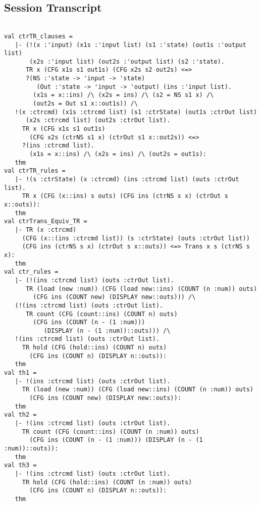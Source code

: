 \documentclass{report}
\begin{document}
\subsection{Session Transcript}
\label{trans6}
\begin{session}
  \begin{scriptsize}
\begin{verbatim}

val ctrTR_clauses =
   |- (!(x :'input) (x1s :'input list) (s1 :'state) (out1s :'output list)
       (x2s :'input list) (out2s :'output list) (s2 :'state).
      TR x (CFG x1s s1 out1s) (CFG x2s s2 out2s) <=>
      ?(NS :'state -> 'input -> 'state)
         (Out :'state -> 'input -> 'output) (ins :'input list).
        (x1s = x::ins) /\ (x2s = ins) /\ (s2 = NS s1 x) /\
        (out2s = Out s1 x::out1s)) /\
   !(x :ctrcmd) (x1s :ctrcmd list) (s1 :ctrState) (out1s :ctrOut list)
      (x2s :ctrcmd list) (out2s :ctrOut list).
     TR x (CFG x1s s1 out1s)
       (CFG x2s (ctrNS s1 x) (ctrOut s1 x::out2s)) <=>
     ?(ins :ctrcmd list).
       (x1s = x::ins) /\ (x2s = ins) /\ (out2s = out1s):
   thm
val ctrTR_rules =
   |- !(s :ctrState) (x :ctrcmd) (ins :ctrcmd list) (outs :ctrOut list).
     TR x (CFG (x::ins) s outs) (CFG ins (ctrNS s x) (ctrOut s x::outs)):
   thm
val ctrTrans_Equiv_TR =
   |- TR (x :ctrcmd)
     (CFG (x::(ins :ctrcmd list)) (s :ctrState) (outs :ctrOut list))
     (CFG ins (ctrNS s x) (ctrOut s x::outs)) <=> Trans x s (ctrNS s x):
   thm
val ctr_rules =
   |- (!(ins :ctrcmd list) (outs :ctrOut list).
      TR (load (new :num)) (CFG (load new::ins) (COUNT (n :num)) outs)
        (CFG ins (COUNT new) (DISPLAY new::outs))) /\
   (!(ins :ctrcmd list) (outs :ctrOut list).
      TR count (CFG (count::ins) (COUNT n) outs)
        (CFG ins (COUNT (n - (1 :num)))
           (DISPLAY (n - (1 :num))::outs))) /\
   !(ins :ctrcmd list) (outs :ctrOut list).
     TR hold (CFG (hold::ins) (COUNT n) outs)
       (CFG ins (COUNT n) (DISPLAY n::outs)):
   thm
val th1 =
   |- !(ins :ctrcmd list) (outs :ctrOut list).
     TR (load (new :num)) (CFG (load new::ins) (COUNT (n :num)) outs)
       (CFG ins (COUNT new) (DISPLAY new::outs)):
   thm
val th2 =
   |- !(ins :ctrcmd list) (outs :ctrOut list).
     TR count (CFG (count::ins) (COUNT (n :num)) outs)
       (CFG ins (COUNT (n - (1 :num))) (DISPLAY (n - (1 :num))::outs)):
   thm
val th3 =
   |- !(ins :ctrcmd list) (outs :ctrOut list).
     TR hold (CFG (hold::ins) (COUNT (n :num)) outs)
       (CFG ins (COUNT n) (DISPLAY n::outs)):
   thm

\end{verbatim}
  \end{scriptsize}
\end{session}
\end{document}
